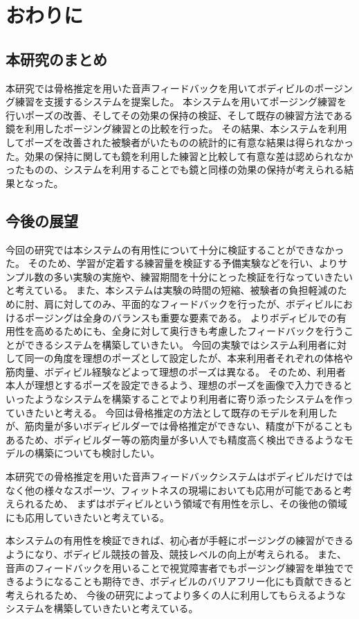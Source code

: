 \chapter{おわりに}
\label{conclusion}

\section{本研究のまとめ}
本研究では骨格推定を用いた音声フィードバックを用いてボディビルのポージング練習を支援するシステムを提案した。
本システムを用いてポージング練習を行いポーズの改善、そしてその効果の保持の検証、そして既存の練習方法である鏡を利用したポージング練習との比較を行った。
その結果、本システムを利用してポーズを改善された被験者がいたものの統計的に有意な結果は得られなかった。効果の保持に関しても鏡を利用した練習と比較して有意な差は認められなかったものの、システムを利用することでも鏡と同様の効果の保持が考えられる結果となった。

\section{今後の展望}

今回の研究では本システムの有用性について十分に検証することができなかった。
そのため、学習が定着する練習量を検証する予備実験などを行い、よりサンプル数の多い実験の実施や、練習期間を十分にとった検証を行なっていきたいと考えている。
また、本システムは実験の時間の短縮、被験者の負担軽減のために肘、肩に対してのみ、平面的なフィードバックを行ったが、ボディビルにおけるポージングは全身のバランスも重要な要素である。
よりボディビルでの有用性を高めるためにも、全身に対して奥行きも考慮したフィードバックを行うことができるシステムを構築していきたい。
今回の実験ではシステム利用者に対して同一の角度を理想のポーズとして設定したが、本来利用者それぞれの体格や筋肉量、ボディビル経験などよって理想のポーズは異なる。
そのため、利用者本人が理想とするポーズを設定できるよう、理想のポーズを画像で入力できるといったようなシステムを構築することでより利用者に寄り添ったシステムを作っていきたいと考える。
今回は骨格推定の方法として既存のモデルを利用したが、筋肉量が多いボディビルダーでは骨格推定ができない、精度が下がることもあるため、ボディビルダー等の筋肉量が多い人でも精度高く検出できるようなモデルの構築についても検討したい。

本研究での骨格推定を用いた音声フィードバックシステムはボディビルだけではなく他の様々なスポーツ、フィットネスの現場においても応用が可能であると考えられるため、
まずはボディビルという領域で有用性を示し、その後他の領域にも応用していきたいと考えている。

本システムの有用性を検証できれば、初心者が手軽にポージングの練習ができるようになり、ボディビル競技の普及、競技レベルの向上が考えられる。
また、音声のフィードバックを用いることで視覚障害者でもポージング練習を単独でできるようになることも期待でき、ボディビルのバリアフリー化にも貢献できると考えられるため、
今後の研究によってより多くの人に利用してもらえるようなシステムを構築していきたいと考えている。
